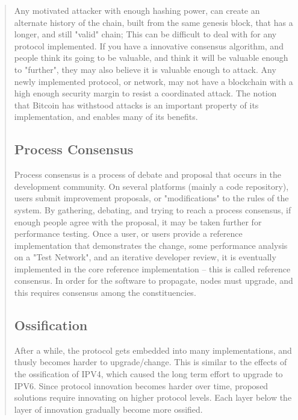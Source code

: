 \documentclass[12pt, titlepage, twocolumn]{report}
\begin{document}
\begin{quotation}
Any motivated attacker with enough hashing power, can create an alternate history of the chain, built from the same genesis block, that has a longer, and still "valid" chain; This can be difficult to deal with for any protocol implemented. If you have a innovative consensus algorithm, and people think its going to be valuable, and think it will be valuable enough to "further", they may also believe it is valuable enough to attack. Any newly implemented protocol, or network, may not have a blockchain with a high enough security margin to resist a coordinated attack. The notion that Bitcoin has withstood attacks is an important property of its implementation, and enables many of its benefits.

\subsection{Process Consensus}
Process consensus is a process of debate and proposal that occurs in the development community. On several platforms (mainly a code repository), users submit improvement proposals, or "modifications" to the rules of the system. By gathering, debating, and trying to reach a process consensus, if enough people agree with the proposal, it may be taken further for performance testing. Once a user, or users provide a reference implementation that demonstrates the change, some performance analysis on a "Test Network", and an iterative developer review, it is eventually implemented in the core reference implementation -- this is called reference consensus. In order for the software to propagate, nodes must upgrade, and this requires consensus among the constituencies.

\subsection{Ossification}
After a while, the protocol gets embedded into many implementations, and thusly becomes harder to upgrade/change. This is similar to the effects of the ossification of IPV4, which caused the long term effort to upgrade to IPV6. Since protocol innovation becomes harder over time, proposed solutions require innovating on higher protocol levels. Each layer below the layer of innovation gradually become more ossified. 



\end{quotation}
\end{document}
